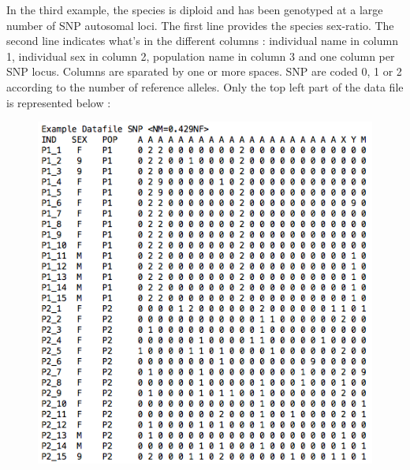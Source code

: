 In the third example, the species is diploid and has been genotyped at a large number of SNP autosomal loci. The first line provides the species sex-ratio. The second line indicates what's in the different columns : individual name in column 1, individual sex in column 2, population name in column 3 and one column per SNP locus. Columns are sparated by one or more spaces. SNP are coded 0, 1 or 2 according to the number of reference alleles. Only the top left part of the data file is represented below :

\begin{figure}[h]
\includegraphics[scale=0.5]{gui_pictures/screenga003.png}
\end{figure}



\clearpage
